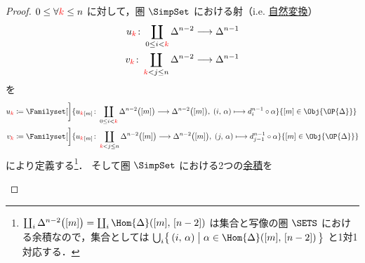 \documentclass[TQFT_main]{subfiles}
\begin{document}
\begin{proof}
    $0 \le \forall \textcolor{red}{k} \le n$ に対して，圏 $\SimpSet$ における射（i.e. \hyperref[def:nat]{自然変換}）
    \begin{align}
        u_{\textcolor{red}{k}} \colon \coprod_{0 \le i < \textcolor{red}{k}} \Delta^{n-2} &\longrightarrow \Delta^{n-1} \\
        v_{\textcolor{red}{k}} \colon \coprod_{\textcolor{red}{k} < j \le n} \Delta^{n-2} &\longrightarrow \Delta^{n-1}
    \end{align}
    を
    \begin{align}
        u_{\textcolor{red}{k}} &\coloneqq \Familyset[\bigg]{u_{\textcolor{red}{k}}{}_{[m]} \colon \coprod_{0 \le i < \textcolor{red}{k}} \Delta^{n-2}\bigl( [m] \bigr)  \lto \Delta^{n-2}\bigl([m]\bigr),\; (i,\, \alpha) \lmto d_i^{n-1} \circ \alpha}{[m] \in \Obj{\OP{\Delta}}} \\
        v_{\textcolor{red}{k}} &\coloneqq \Familyset[\bigg]{u_{\textcolor{red}{k}}{}_{[m]} \colon \coprod_{\textcolor{red}{k} < j \le n} \Delta^{n-2}\bigl( [m] \bigr)  \lto \Delta^{n-2}\bigl([m]\bigr),\; (j,\, \alpha) \lmto d_{j-1}^{n-1} \circ \alpha}{[m] \in \Obj{\OP{\Delta}}}
    \end{align}
    により定義する\footnote{$\coprod_{i} \Delta^{n-2}\bigl( [m] \bigr) = \coprod_{i} \Hom{\Delta}([m],\, [n-2])$ は集合と写像の圏 $\SETS$ における余積なので，集合としては $\bigcup_{i}\bigl\{\, (i,\, \alpha) \bigm| \alpha \in \Hom{\Delta}([m],\, [n-2]) \,\bigr\}$ と1対1対応する．}．
    そして圏 $\SimpSet$ における2つの\hyperref[def:product-coproduct]{余積}を
    \begin{center}
\end{center}
\end{proof}
\end{document}
